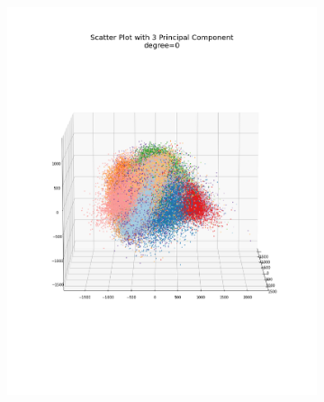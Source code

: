 \documentclass[12pt, a4paper]{article}
\begin{document}
\begin{figure}[h]
    \centering
    \begin{subfigure}{0.3\linewidth}
        \centering
        \includegraphics[width=\linewidth]{images/q4/a/projection_to_3d_with_angle0.png}
    \end{subfigure}
    \hfill
    \begin{subfigure}{0.3\linewidth}
        \centering

\end{subfigure}
\end{figure}
\end{document}
